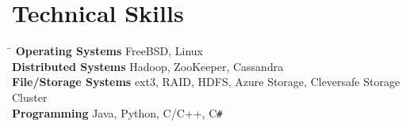 \documentclass[10pt]{article} %
\begin{document}
%


\section{Technical Skills}

\begin{tabbing}
\hspace{4cm} \= \kill
\textbf{Operating Systems} \> FreeBSD, Linux \\
\textbf{Distributed Systems} \> Hadoop, ZooKeeper, Cassandra \\
\textbf{File/Storage Systems} \> ext3, RAID, HDFS, Azure Storage, Cleversafe Storage Cluster\\
\textbf{Programming} \> Java, Python, C/C++, C\texttt{\#}
\end{tabbing}
\end{document}
